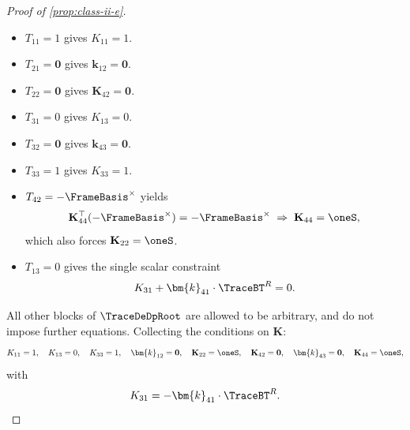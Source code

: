 \begin{proof}[Proof of \cref{prop:class-ii-e}]
\begin{itemize}
  \item \(T_{11} = 1\) gives \(K_{11} = 1\).
  \item \(T_{21} = \mathbf{0}\) gives \(\bm{k}_{12} = \mathbf{0}\).
  \item \(T_{22} = \mathbf{0}\) gives \(\mathbf{K}_{42} = \mathbf{0}\).
  \item \(T_{31} = 0\) gives \(K_{13} = 0\).
  \item \(T_{32} = \mathbf{0}\) gives \(\bm{k}_{43} = \mathbf{0}\).
  \item \(T_{33} = 1\) gives \(K_{33} = 1\).
  \item \(T_{42} = -\FrameBasis^\times\) yields
    \[
      \mathbf{K}_{44}^\top (-\FrameBasis^\times) = -\FrameBasis^\times
      \;\Rightarrow\;
      \mathbf{K}_{44} = \oneS,
    \]
    which also forces \(\mathbf{K}_{22} = \oneS\).
  \item \(T_{13} = 0\) gives the single scalar constraint
    \begin{equation*}
      K_{31} + \bm{k}_{41}\cdot\TraceBT^R = 0.
    \end{equation*}
\end{itemize}

All other blocks of \(\TraceDeDpRoot\) are allowed to be arbitrary, and do not impose further equations. 
Collecting the conditions on \(\mathbf{K}\):
\[
  K_{11} = 1,\quad
  K_{13} = 0,\quad
  K_{33} = 1,\quad
  \bm{k}_{12} = \mathbf{0},\quad
  \mathbf{K}_{22} = \oneS,\quad
  \mathbf{K}_{42} = \mathbf{0},\quad
  \bm{k}_{43} = \mathbf{0},\quad
  \mathbf{K}_{44} = \oneS,
\]
with
\[
  K_{31} = -\bm{k}_{41}\cdot\TraceBT^R.
\]


\end{proof}
